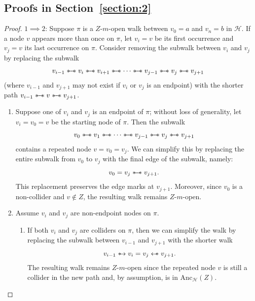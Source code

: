 \documentclass[accepted]{uai2025} %
\newcommand{\anc}{\text{Anc}}
\newcommand{\hus}{\mathrel{{\leftarrow\mkern-11mu\ast}}}
\newcommand{\suh}{\mathrel{{\ast\mkern-11mu\to}}}
\newcommand{\sus}{\mathrel{{\ast\mkern-11mu\relbar\mkern-9mu\relbar\mkern-11mu\ast}}}
\begin{document}
\subsection{Proofs in Section~\ref{section:2}}
\walkpath*
\begin{proof}
$1\implies 2$: Suppose $\pi$ is a $Z$-$m$-open walk between $v_0=a$ and $v_n=b$ in $\mathcal{H}$. If a node $v$ appears more than once on $\pi$, let $v_i = v$ be its first occurrence and $v_j = v$ its last occurrence on $\pi$. Consider removing the subwalk between $v_i$ and $v_j$ by replacing the subwalk
\[
v_{i-1} \sus v_i \sus v_{i+1} \sus \cdots \sus v_{j-1} \sus v_j \sus v_{j+1}
\]
(where $v_{i-1}$ and $v_{j+1}$ may not exist if $v_i$ or $v_j$ is an endpoint) with the shorter path $v_{i-1} \sus v \sus v_{j+1}$.

\begin{enumerate}
    \item Suppose one of $v_i$ and $v_j$ is an endpoint of $\pi$; without loss of generality, let $v_i = v_0 = v$ be the starting node of $\pi$. Then the subwalk
    \[
    v_0 \sus v_1 \sus \cdots \sus v_{j-1} \sus v_j \sus v_{j+1}
    \]
    contains a repeated node $v = v_0 = v_j$. We can simplify this by replacing the entire subwalk from \( v_0 \) to \( v_j \) with the final edge of the subwalk, namely:
    \[
    v_0 = v_j \sus v_{j+1}.
    \]
    This replacement preserves the edge marks at $v_{j+1}$. Moreover, since $v_0$ is a non-collider and $v \notin Z$, the resulting walk remains $Z$-$m$-open.

    \item Assume $v_i$ and $v_j$ are non-endpoint nodes on $\pi$.
    \begin{enumerate}
        \item If both \( v_i \) and \( v_j \) are colliders on \( \pi \), then we can simplify the walk by replacing the subwalk between \( v_{i-1} \) and \( v_{j+1} \) with the shorter walk
        \[
        v_{i-1} \suh v_i = v_j \hus v_{j+1}.
        \]
        The resulting walk remains \( Z \)-\( m \)-open since the repeated node \( v \) is still a collider in the new path and, by assumption, is in \( \anc_\mathcal{H}(Z) \).


\end{enumerate}
\end{enumerate}
\end{proof}
\end{document}
